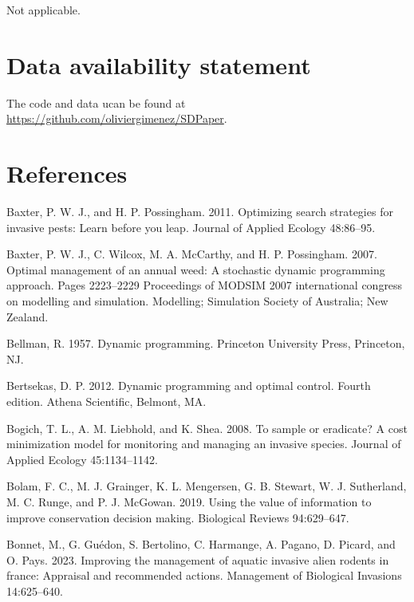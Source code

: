 \documentclass[
  11pt,
  a4paper,
]{article}
\newlength{\cslhangindent}
\newenvironment{CSLReferences}[2] %
 {\begin{list}{}{%
  \setlength{\itemindent}{0pt}
  \setlength{\leftmargin}{0pt}
  \setlength{\parsep}{0pt}
  \ifodd #1
   \setlength{\leftmargin}{\cslhangindent}
   \setlength{\itemindent}{-1\cslhangindent}
  \fi
  \setlength{\itemsep}{#2\baselineskip}}}
 {\end{list}}
\begin{document}
Not applicable.

\section{Data availability statement}\label{data-availability-statement}

The code and data ucan be found at \href{https://github.com/oliviergimenez/SDPaper}{https://github.com/oliviergimenez/SDPaper}.

\section{References}\label{references}

\label{refs}
\begin{CSLReferences}{1}{0}
Baxter, P. W. J., and H. P. Possingham. 2011. Optimizing search strategies for invasive pests: Learn before you leap. Journal of Applied Ecology 48:86--95.

Baxter, P. W. J., C. Wilcox, M. A. McCarthy, and H. P. Possingham. 2007. Optimal management of an annual weed: A stochastic dynamic programming approach. Pages 2223--2229 Proceedings of MODSIM 2007 international congress on modelling and simulation. Modelling; Simulation Society of Australia; New Zealand.

Bellman, R. 1957. Dynamic programming. Princeton University Press, Princeton, NJ.

Bertsekas, D. P. 2012. Dynamic programming and optimal control. Fourth edition. Athena Scientific, Belmont, MA.

Bogich, T. L., A. M. Liebhold, and K. Shea. 2008. To sample or eradicate? {A} cost minimization model for monitoring and managing an invasive species. Journal of Applied Ecology 45:1134--1142.

Bolam, F. C., M. J. Grainger, K. L. Mengersen, G. B. Stewart, W. J. Sutherland, M. C. Runge, and P. J. McGowan. 2019. Using the value of information to improve conservation decision making. Biological Reviews 94:629--647.

Bonnet, M., G. Guédon, S. Bertolino, C. Harmange, A. Pagano, D. Picard, and O. Pays. 2023. Improving the management of aquatic invasive alien rodents in france: Appraisal and recommended actions. Management of Biological Invasions 14:625--640.


\end{CSLReferences}
\end{document}
